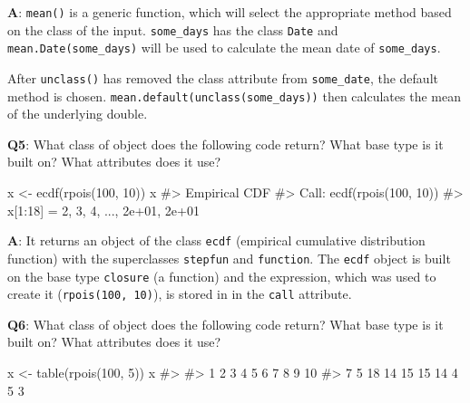 \documentclass[
]{krantz}
\makeatletter
\newenvironment{Shaded}{\begin{snugshade}}{\end{snugshade}}
\newcommand{\CommentTok}[1]{\textcolor[rgb]{0.56,0.35,0.01}{\textit{#1}}}
\newcommand{\DecValTok}[1]{\textcolor[rgb]{0.00,0.00,0.81}{#1}}
\newcommand{\KeywordTok}[1]{\textcolor[rgb]{0.13,0.29,0.53}{\textbf{#1}}}
\newcommand{\NormalTok}[1]{#1}
\newcommand{\StringTok}[1]{\textcolor[rgb]{0.31,0.60,0.02}{#1}}
\newenvironment{kframe}{%
\medskip{}
\setlength{\fboxsep}{.8em}
 \def\at@end@of@kframe{}%
 \ifinner\ifhmode%
  \def\at@end@of@kframe{\end{minipage}}%
  \begin{minipage}{\columnwidth}%
 \fi\fi%
 \def\FrameCommand##1{\hskip\@totalleftmargin \hskip-\fboxsep
 \colorbox{shadecolor}{##1}\hskip-\fboxsep
     \hskip-\linewidth \hskip-\@totalleftmargin \hskip\columnwidth}%
 \MakeFramed {\advance\hsize-\width
   \@totalleftmargin\z@ \linewidth\hsize
   \@setminipage}}%
 {\par\unskip\endMakeFramed%
 \at@end@of@kframe}
\renewenvironment{Shaded}{\begin{kframe}}{\end{kframe}}
\renewcommand{\KeywordTok} [1]{\textcolor[rgb]{0.00,0.44,0.13}{{#1}}}
\renewcommand{\DecValTok}  [1]{\textcolor[rgb]{0.25,0.63,0.44}{{#1}}}
\renewcommand{\StringTok}  [1]{\textcolor[rgb]{0.25,0.44,0.63}{{#1}}}
\renewcommand{\CommentTok} [1]{\textcolor[rgb]{0.38,0.63,0.69}{{#1}}}
\renewcommand{\NormalTok}  [1]{{#1}}
\makeatother
\begin{document}
\textbf{{A}}: \texttt{mean()} is a generic function, which will select the appropriate method based on the class of the input. \texttt{some\_days} has the class \texttt{Date} and \texttt{mean.Date(some\_days)} will be used to calculate the mean date of \texttt{some\_days}.

After \texttt{unclass()} has removed the class attribute from \texttt{some\_date}, the default method is chosen. \texttt{mean.default(unclass(some\_days))} then calculates the mean of the underlying double.

\textbf{{Q5}}: What class of object does the following code return? What base type is it built on? What attributes does it use?

\begin{Shaded}
\begin{Highlighting}[]
\NormalTok{x <-}\StringTok{ }\KeywordTok{ecdf}\NormalTok{(}\KeywordTok{rpois}\NormalTok{(}\DecValTok{100}\NormalTok{, }\DecValTok{10}\NormalTok{))}
\NormalTok{x}
\CommentTok{#> Empirical CDF }
\CommentTok{#> Call: ecdf(rpois(100, 10))}
\CommentTok{#>  x[1:18] =  2,  3,  4,  ..., 2e+01, 2e+01}
\end{Highlighting}
\end{Shaded}

\textbf{{A}}: It returns an object of the class \texttt{ecdf} (empirical cumulative distribution function) with the superclasses \texttt{stepfun} and \texttt{function}. The \texttt{ecdf} object is built on the base type \texttt{closure} (a function) and the expression, which was used to create it (\texttt{rpois(100,\ 10)}), is stored in in the \texttt{call} attribute.

\begin{Shaded}
\end{Shaded}

\textbf{{Q6}}: What class of object does the following code return? What base type is it built on? What attributes does it use?

\begin{Shaded}
\begin{Highlighting}[]
\NormalTok{x <-}\StringTok{ }\KeywordTok{table}\NormalTok{(}\KeywordTok{rpois}\NormalTok{(}\DecValTok{100}\NormalTok{, }\DecValTok{5}\NormalTok{))}
\NormalTok{x}
\CommentTok{#> }
\CommentTok{#>  1  2  3  4  5  6  7  8  9 10 }
\CommentTok{#>  7  5 18 14 15 15 14  4  5  3}
\end{Highlighting}
\end{Shaded}
\end{document}
